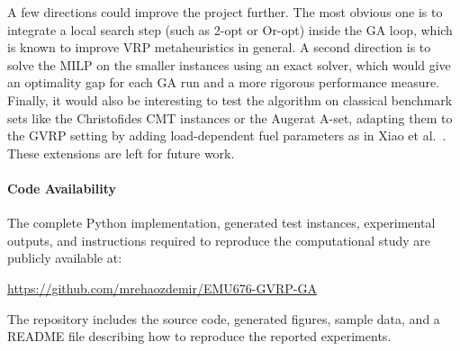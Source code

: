 \documentclass [a4paper, 11pt, titlepage] {article}
\begin{document}
A few directions could improve the project further. The most obvious one is to integrate a local search step (such as 2-opt or Or-opt) inside the GA loop, which is known to improve VRP metaheuristics in general. A second direction is to solve the MILP on the smaller instances using an exact solver, which would give an optimality gap for each GA run and a more rigorous performance measure. Finally, it would also be interesting to test the algorithm on classical benchmark sets like the Christofides CMT instances or the Augerat A-set, adapting them to the GVRP setting by adding load-dependent fuel parameters as in Xiao et al.\ \cite{xiao2012}. These extensions are left for future work.


\paragraph{Code Availability}

The complete Python implementation, generated test instances,
experimental outputs, and instructions required to reproduce the
computational study are publicly available at:

\url{https://github.com/mrehaozdemir/EMU676-GVRP-GA}

The repository includes the source code, generated figures,
sample data, and a README file describing how to reproduce
the reported experiments.
\end{document}
